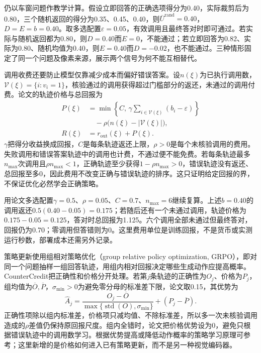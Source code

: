 仍以车窗问题作教学计算。假设立即回答的正确选项得分为0.40，实际裁剪后为0.80，三个随机返回的得分为0.35、0.45、0.40，则$\overline U^{\mathrm{rand}}=0.40$，$D=E=b=0.40$。取多选配置$\varepsilon=0.05$，有效调用且最终答对时即可通过。若实际与随机返回都为0.80，则$D=0.40$而$E=0$，不能通过；若立即回答为0.82、实际为0.80、随机均值为0.40，则$E=0.40$而$D=-0.02$，也不能通过。三种情形固定了同一个问题及像素来源，展示两个信号为何不能互相替代。

调用收费还要防止模型仅靠减少成本而偏好错误答案。设$n(\xi)$为已执行调用数，$\mathcal V(\xi)=\{i:v_i=1\}$，核验通过的调用获得超过门槛部分的返还，未通过的调用付费。论文的轨迹价格与总回报为
\begin{equation}
  \begin{aligned}
    P(\xi)
      &=\min\left\{C,\,
         \gamma\sum_{i\in\mathcal V(\xi)}(b_i-\varepsilon)\right\}\\
      &\quad-\rho\bigl(n(\xi)-|\mathcal V(\xi)|\bigr),\\
    R(\xi)&=r_{\mathrm{out}}(\xi)+P(\xi).
  \end{aligned}
  \label{eq:vision-countercredit-price}
\end{equation}
$\gamma$把得分收益换成回报，$C$是每条轨迹返还上限，$\rho>0$是每个未核验调用的费用。失败调用和错误答案轨迹中的调用也计费，不通过便不能免费。若每条轨迹最多$n_{\max}$次调用且$\rho n_{\max}<1$，正确轨迹至少获得$1-\rho n_{\max}>0$，错误轨迹没有返还、总回报至多0，因此费用不改变正确与错误轨迹的排序。这只证明给定回报的界，不保证优化必然学会正确策略。

用论文多选配置$\gamma=0.5$、$\rho=0.05$、$C=0.7$、$n_{\max}=6$继续复算。上述$b=0.40$的调用返还$0.5(0.40-0.05)=0.175$；若随后还有一个未通过调用，轨迹价格为$0.175-0.05=0.125$，答对时总回报为1.125。六个调用全部未通过但最终答对，回报仍为0.70；零调用但答错则为0。这里费用单位是训练回报，不是货币或实测运行秒数，部署成本还需另外记录。

策略更新使用组相对策略优化（group relative policy optimization, GRPO），即对同一个问题抽样一组回答轨迹，用组内相对回报决定哪些生成动作应提高概率。CounterCredit把正确性和价格分开处理。若第$j$条轨迹的正确性为$O_j$、价格为$P_j$，组均值为$\overline O,\overline P$，$\sigma_{\min}>0$为避免零分母的标准差下限，论文取0.15，其优势为
\begin{equation}
  \widehat A_j=
    \frac{O_j-\overline O}
         {\max\{\operatorname{std}(O),\sigma_{\min}\}}
       +(P_j-\overline P).
  \label{eq:vision-countercredit-advantage}
\end{equation}
正确性项除以组内标准差，价格项只减均值、不除标准差，所以多一次未核验调用造成的$\rho$差值仍保持原回报尺度。组内全错时，论文把价格优势设为0，避免只根据错误轨迹中的调用数学习。根据优势提高或降低动作概率的策略学习原理可参考；这里新增的是价格如何进入已有策略更新，而不是另一种视觉编码器。

